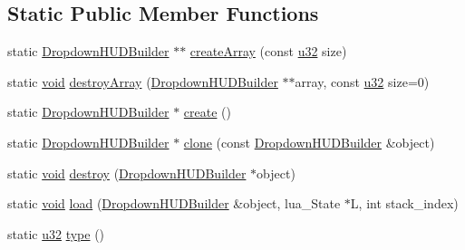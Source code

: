 \subsection*{Static Public Member Functions}
\begin{DoxyCompactItemize}
\item 
static \mbox{\hyperlink{classnjli_1_1_dropdown_h_u_d_builder}{Dropdown\+H\+U\+D\+Builder}} $\ast$$\ast$ \mbox{\hyperlink{classnjli_1_1_dropdown_h_u_d_builder_a2ef0dd84f858070b1184ea83828d7154}{create\+Array}} (const \mbox{\hyperlink{_util_8h_a10e94b422ef0c20dcdec20d31a1f5049}{u32}} size)
\item 
static \mbox{\hyperlink{_thread_8h_af1e856da2e658414cb2456cb6f7ebc66}{void}} \mbox{\hyperlink{classnjli_1_1_dropdown_h_u_d_builder_a6bfd29a4923eae10fa7fa75941e13356}{destroy\+Array}} (\mbox{\hyperlink{classnjli_1_1_dropdown_h_u_d_builder}{Dropdown\+H\+U\+D\+Builder}} $\ast$$\ast$array, const \mbox{\hyperlink{_util_8h_a10e94b422ef0c20dcdec20d31a1f5049}{u32}} size=0)
\item 
static \mbox{\hyperlink{classnjli_1_1_dropdown_h_u_d_builder}{Dropdown\+H\+U\+D\+Builder}} $\ast$ \mbox{\hyperlink{classnjli_1_1_dropdown_h_u_d_builder_a96f017bc6d7b45dec3ef8ee888df6b3b}{create}} ()
\item 
static \mbox{\hyperlink{classnjli_1_1_dropdown_h_u_d_builder}{Dropdown\+H\+U\+D\+Builder}} $\ast$ \mbox{\hyperlink{classnjli_1_1_dropdown_h_u_d_builder_aca6da429a5e00cc0a42ababa96af00fa}{clone}} (const \mbox{\hyperlink{classnjli_1_1_dropdown_h_u_d_builder}{Dropdown\+H\+U\+D\+Builder}} \&object)
\item 
static \mbox{\hyperlink{_thread_8h_af1e856da2e658414cb2456cb6f7ebc66}{void}} \mbox{\hyperlink{classnjli_1_1_dropdown_h_u_d_builder_a3753bf65cad6ab930b901f9a8ef5e4a9}{destroy}} (\mbox{\hyperlink{classnjli_1_1_dropdown_h_u_d_builder}{Dropdown\+H\+U\+D\+Builder}} $\ast$object)
\item 
static \mbox{\hyperlink{_thread_8h_af1e856da2e658414cb2456cb6f7ebc66}{void}} \mbox{\hyperlink{classnjli_1_1_dropdown_h_u_d_builder_a6e85e68b01c42e39c250e5c133bf240e}{load}} (\mbox{\hyperlink{classnjli_1_1_dropdown_h_u_d_builder}{Dropdown\+H\+U\+D\+Builder}} \&object, lua\+\_\+\+State $\ast$L, int stack\+\_\+index)
\item 
static \mbox{\hyperlink{_util_8h_a10e94b422ef0c20dcdec20d31a1f5049}{u32}} \mbox{\hyperlink{classnjli_1_1_dropdown_h_u_d_builder_ab15297f8f1c7c1e73a4a7ff40f693b35}{type}} ()
\end{DoxyCompactItemize}

